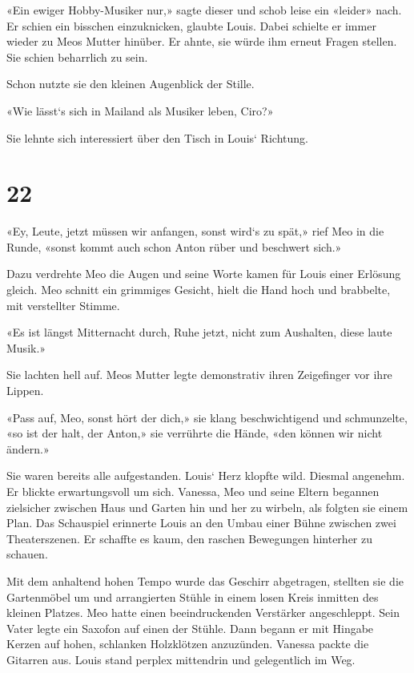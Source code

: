 «Ein ewiger Hobby-Musiker nur,» sagte dieser und schob leise ein
«leider» nach. Er schien ein bisschen einzuknicken, glaubte Louis. Dabei
schielte er immer wieder zu Meos Mutter hinüber. Er ahnte, sie würde ihm
erneut Fragen stellen. Sie schien beharrlich zu sein.

Schon nutzte sie den kleinen Augenblick der Stille.

«Wie lässt`s sich in Mailand als Musiker leben, Ciro?»

Sie lehnte sich interessiert über den Tisch in Louis` Richtung.

\chapter{22}\label{section-21}

«Ey, Leute, jetzt müssen wir anfangen, sonst wird`s zu spät,» rief Meo
in die Runde, «sonst kommt auch schon Anton rüber und beschwert sich.»

Dazu verdrehte Meo die Augen und seine Worte kamen für Louis einer
Erlösung gleich. Meo schnitt ein grimmiges Gesicht, hielt die Hand hoch
und brabbelte, mit verstellter Stimme.

«Es ist längst Mitternacht durch, Ruhe jetzt, nicht zum Aushalten, diese
laute Musik.»

Sie lachten hell auf. Meos Mutter legte demonstrativ ihren Zeigefinger
vor ihre Lippen.

«Pass auf, Meo, sonst hört der dich,» sie klang beschwichtigend und
schmunzelte, «so ist der halt, der Anton,» sie verrührte die Hände, «den
können wir nicht ändern.»

Sie waren bereits alle aufgestanden. Louis` Herz klopfte wild. Diesmal
angenehm. Er blickte erwartungsvoll um sich. Vanessa, Meo und seine
Eltern begannen zielsicher zwischen Haus und Garten hin und her zu
wirbeln, als folgten sie einem Plan. Das Schauspiel erinnerte Louis an
den Umbau einer Bühne zwischen zwei Theaterszenen. Er schaffte es kaum,
den raschen Bewegungen hinterher zu schauen.

Mit dem anhaltend hohen Tempo wurde das Geschirr abgetragen, stellten
sie die Gartenmöbel um und arrangierten Stühle in einem losen Kreis
inmitten des kleinen Platzes. Meo hatte einen beeindruckenden Verstärker
angeschleppt. Sein Vater legte ein Saxofon auf einen der Stühle. Dann
begann er mit Hingabe Kerzen auf hohen, schlanken Holzklötzen
anzuzünden. Vanessa packte die Gitarren aus. Louis stand perplex
mittendrin und gelegentlich im Weg.

